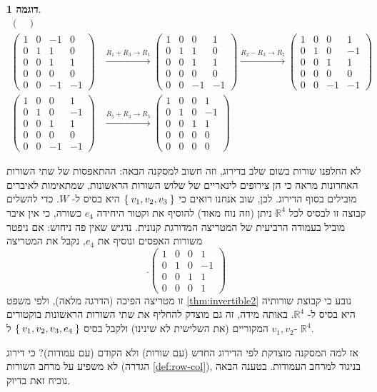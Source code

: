 \documentclass[12pt]{report}
\theoremstyle{plain}
\theoremstyle{definition}
\newtheorem{example}{דוגמה}[chapter]
\newcommand{\R}{\mathbb{R}}
\newcommand{\0}{\mathbf{0}}
\begin{document}
\begin{example}
$$\begin{aligned}
\begin{pmatrix}
\end{pmatrix}
\\[10pt]
\begin{pmatrix}
1&0&-1&0\\
0&1&1&0\\
0&0&1&1\\
0&0&0&0\\
0&0&-1&-1
\end{pmatrix}
&\xrightarrow{R_1+R_3\to R_1}
\begin{pmatrix}
1&0&0&1\\
0&1&1&0\\
0&0&1&1\\
0&0&0&0\\
0&0&-1&-1
\end{pmatrix}
\xrightarrow{R_2-R_3\to R_2}
\begin{pmatrix}
1&0&0&1\\
0&1&0&-1\\
0&0&1&1\\
0&0&0&0\\
0&0&-1&-1
\end{pmatrix}
\\[10pt]
\begin{pmatrix}
1&0&0&1\\
0&1&0&-1\\
0&0&1&1\\
0&0&0&0\\
0&0&-1&-1
\end{pmatrix}
&\xrightarrow{R_5+R_3\to R_5}
\begin{pmatrix}
1&0&0&1\\
0&1&0&-1\\
0&0&1&1\\
0&0&0&0\\
0&0&0&0
\end{pmatrix}
\end{aligned}
$$

לא החלפנו שורות בשום שלב בדירוג, וזה חשוב למסקנה הבאה: ההתאפסות של שתי השורות האחרונות מראה כי הן צירופים לינאריים של שלוש השורות הראשונות, שמתאימות לאיברים מובילים בסוף הדירוג. לכן, שוב אנחנו רואים כי
$\Set{v_1,v_2,v_3}$
היא בסיס ל-
$W$.
כדי להשלים קבוצה זו לבסיס לכל
$\R^4$
ניתן (וזה נוח מאוד) להוסיף את וקטור היחידה
$e_4$
כשורה, כי אין איבר מוביל בעמודה הרביעית של המטריצה המדורגת קנונית. נדגיש שאין פה ניחוש: אם ניפטר משורות האפסים ונוסיף את 
$e_4$,
נקבל את המטריצה
$$
.\begin{pmatrix}
1&0&0&1\\
0&1&0&-1\\
0&0&1&1\\
0&0&0&1
\end{pmatrix}
$$
זו מטריצה הפיכה (הדרגה מלאה), ולפי משפט
\ref{thm:invertible2}
נובע כי קבוצת שורותיה היא בסיס ל-
$\R^4$.
באותה מידה, זה גם מוצדק להחליף את שתי השורות הראשונות בוקטורים 
$v_1,v_2$
המקוריים (את השלישית לא שינינו) ולקבל בסיס
$\Set{v_1,v_2,v_3,e_4}$
ל-
$\R^4$.

אז למה המסקנה מוצדקת לפי הדירוג החדש (עם שורות) ולא הקודם (עם עמודות)? כי דירוג לא משפיע על מרחב השורות (הגדרה
\ref{def:row-col}),
בניגוד למרחב העמודות. בטענה הבאה נוכיח זאת בדיוק.

\end{example}
\end{document}

